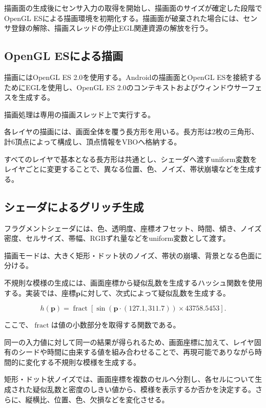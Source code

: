 描画面の生成後にセンサ入力の取得を開始し、描画面のサイズが確定した段階でOpenGL ESによる描画環境を初期化する。描画面が破棄された場合には、センサ登録の解除、描画スレッドの停止EGL関連資源の解放を行う。


\subsection{OpenGL ESによる描画}

描画にはOpenGL ES 2.0を使用する。Androidの描画面とOpenGL ESを接続するためにEGLを使用し、OpenGL ES 2.0のコンテキストおよびウィンドウサーフェスを生成する。

描画処理は専用の描画スレッド上で実行する。

各レイヤの描画には、画面全体を覆う長方形を用いる。長方形は2枚の三角形、計6頂点によって構成し、頂点情報をVBOへ格納する。

すべてのレイヤで基本となる長方形は共通とし、シェーダへ渡すuniform変数をレイヤごとに変更することで、異なる位置、色、ノイズ、帯状崩壊などを生成する。


\subsection{シェーダによるグリッチ生成}

フラグメントシェーダには、色、透明度、座標オフセット、時間、傾き、ノイズ密度、セルサイズ、帯幅、RGBずれ量などをuniform変数として渡す。

描画モードは、大きく矩形・ドット状のノイズ、帯状の崩壊、背景となる色面に分ける。

不規則な模様の生成には、画面座標から疑似乱数を生成するハッシュ関数を使用する。実装では、座標$\mathbf{p}$に対して、次式によって疑似乱数を生成する。

\begin{equation}
h(\mathbf{p})=
\operatorname{fract}
\left[
\sin\left(
\mathbf{p}\cdot(127.1,311.7)
\right)
\times43758.5453
\right].
\end{equation}

ここで、$\operatorname{fract}$は値の小数部分を取得する関数である。

同一の入力値に対して同一の結果が得られるため、画面座標に加えて、レイヤ固有のシードや時間に由来する値を組み合わせることで、再現可能でありながら時間的に変化する不規則な模様を生成する。

矩形・ドット状ノイズでは、画面座標を複数のセルへ分割し、各セルについて生成された疑似乱数と密度のしきい値から、模様を表示するか否かを決定する。さらに、縦横比、位置、色、欠損などを変化させる。

